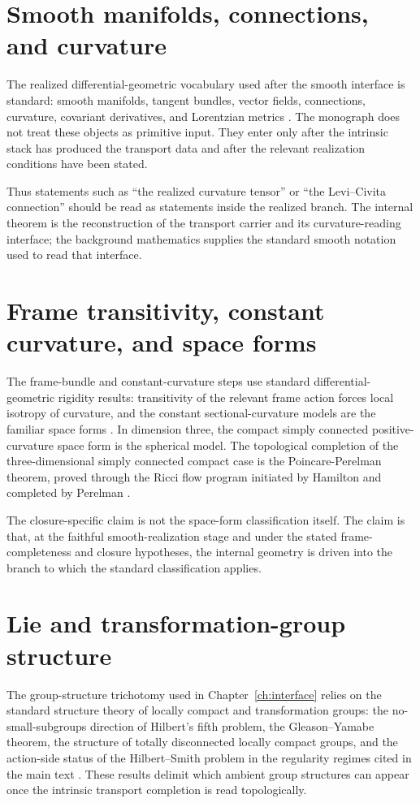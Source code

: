 \section{Smooth manifolds, connections, and curvature}
\label{app:standard-smooth}
The realized differential-geometric vocabulary used after the smooth
interface is standard: smooth manifolds, tangent bundles, vector fields,
connections, curvature, covariant derivatives, and Lorentzian metrics
\cite{Lee2013,KobayashiNomizu1963,Nakahara2003,Wald1984}.  The
monograph does not treat these objects as primitive input.  They enter
only after the intrinsic stack has produced the transport data and after
the relevant realization conditions have been stated.

Thus statements such as ``the realized curvature tensor'' or ``the
Levi--Civita connection'' should be read as statements inside the
realized branch.  The internal theorem is the reconstruction of the
transport carrier and its curvature-reading interface; the background
mathematics supplies the standard smooth notation used to read that
interface.

\section{Frame transitivity, constant curvature, and space forms}
\label{app:standard-spaceforms}
The frame-bundle and constant-curvature steps use standard
differential-geometric rigidity results: transitivity of the relevant
frame action forces local isotropy of curvature, and the constant
sectional-curvature models are the familiar space forms
\cite{KobayashiNomizu1963,Wald1984}.  In dimension three, the compact
simply connected positive-curvature space form is the spherical model.
The topological completion of the three-dimensional simply connected
compact case is the Poincare-Perelman theorem, proved through the Ricci
flow program initiated by Hamilton and completed by Perelman
\cite{Hamilton1982,Perelman2002,Perelman2003Ricci,Perelman2003Finite}.

The closure-specific claim is not the space-form classification itself.
The claim is that, at the faithful smooth-realization stage and under
the stated frame-completeness and closure hypotheses, the internal
geometry is driven into the branch to which the standard classification
applies.

\section{Lie and transformation-group structure}
\label{app:standard-lie}
The group-structure trichotomy used in Chapter~\ref{ch:interface} relies
on the standard structure theory of locally compact and transformation
groups: the no-small-subgroups direction of Hilbert's fifth problem,
the Gleason--Yamabe theorem, the structure of totally disconnected
locally compact groups, and the action-side status of the
Hilbert--Smith problem in the regularity regimes cited in the main text
\cite{Gleason1952,Yamabe1953,MontgomeryZippin1955,vanDantzig1936,Tao2014,RepovsScepin1997,Pardon2013}.
These results delimit which ambient group structures can appear once
the intrinsic transport completion is read topologically.

